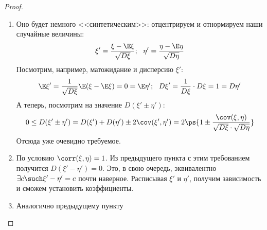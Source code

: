 \begin{proof}~
	\begin{enumerate}
		\item Оно будет немного <<синтетическим>>: отцентрируем и отнормируем наши случайные величины:
		\[
			\xi' = \frac{\xi - \E\xi}{\sqrt{D\xi}};\ \ \eta' = \frac{\eta - \E\eta}{\sqrt{D\eta}}
		\]
		Посмотрим, например, матожидание и дисперсию $\xi'$:
		\[
			\E\xi' = \frac{1}{\sqrt{D\xi}}\E(\xi - \E\xi) = 0 = \E\eta';\ \ D\xi' = \frac{1}{D\xi} \cdot D\xi = 1 = D\eta'
		\]
		А теперь, посмотрим на значение $D(\xi' \pm \eta')$:
		\[
			0 \le D(\xi' \pm \eta') = D(\xi') + D(\eta') \pm 2\cov(\xi', \eta') = 2\ps{1 \pm \frac{\cov(\xi, \eta)}{\sqrt{D\xi} \cdot \sqrt{D\eta}}}
		\]
		Отсюда уже очевидно требуемое.
		
		\item По условию $\corr(\xi, \eta) = 1$. Из предыдущего пункта с этим требованием получится $D(\xi' - \eta') = 0$. Это, в свою очередь, эквивалентно $\exists c \such \xi' - \eta' = c$ почти наверное. Расписывая $\xi'$ и $\eta'$, получим зависимость и сможем установить коэффициенты.
		
		\item Аналогично предыдущему пункту
	\end{enumerate}
\end{proof}